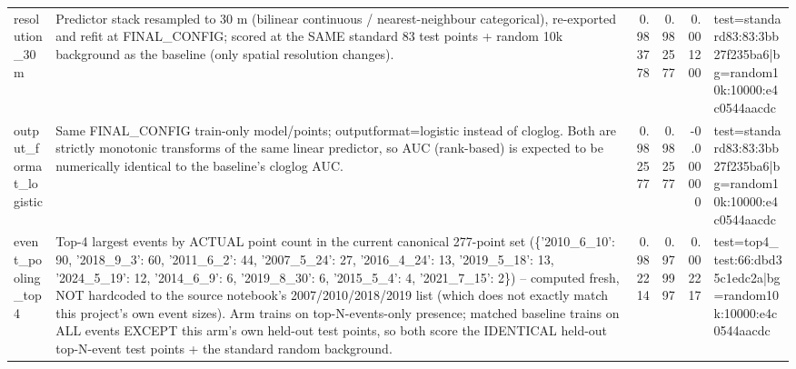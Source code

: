 \begin{tabular}{llrrrl}
resolution\_30m & Predictor stack resampled to 30 m (bilinear continuous / nearest-neighbour categorical), re-exported and refit at FINAL\_CONFIG; scored at the SAME standard 83 test points + random 10k background as the baseline (only spatial resolution changes). & 0.983778 & 0.982577 & 0.001200 & test=standard83:83:3bb27f235ba6|bg=random10k:10000:e4c0544aacdc \\
output\_format\_logistic & Same FINAL\_CONFIG train-only model/points; outputformat=logistic instead of cloglog. Both are strictly monotonic transforms of the same linear predictor, so AUC (rank-based) is expected to be numerically identical to the baseline's cloglog AUC. & 0.982577 & 0.982577 & -0.000000 & test=standard83:83:3bb27f235ba6|bg=random10k:10000:e4c0544aacdc \\
event\_pooling\_top4 & Top-4 largest events by ACTUAL point count in the current canonical 277-point set (\{'2010\_6\_10': 90, '2018\_9\_3': 60, '2011\_6\_2': 44, '2007\_5\_24': 27, '2016\_4\_24': 13, '2019\_5\_18': 13, '2024\_5\_19': 12, '2014\_6\_9': 6, '2019\_8\_30': 6, '2015\_5\_4': 4, '2021\_7\_15': 2\}) -- computed fresh, NOT hardcoded to the source notebook's 2007/2010/2018/2019 list (which does not exactly match this project's own event sizes). Arm trains on top-N-events-only presence; matched baseline trains on ALL events EXCEPT this arm's own held-out test points, so both score the IDENTICAL held-out top-N-event test points + the standard random background. & 0.982214 & 0.979997 & 0.002217 & test=top4\_test:66:dbd35c1edc2a|bg=random10k:10000:e4c0544aacdc \\
\bottomrule
\end{tabular}
